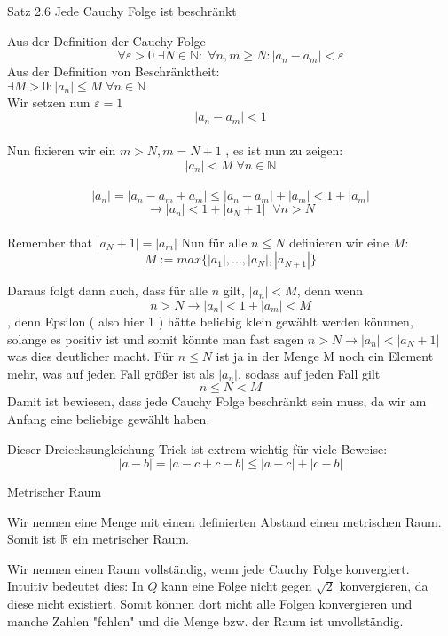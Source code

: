 \documentclass[headsepline,12pt,a4paper]{scrartcl}
\begin{document}
\newpage
\begin{center}
\item[Satz 2.6 Jede Cauchy Folge ist beschränkt]
\end{center}
\item Aus der Definition der Cauchy Folge 
$$ \forall \varepsilon > 0 \; \exists N \in \mathbb{N} : \; \forall n,m \geq N : |a_n-a_m| < \varepsilon $$
Aus der Definition von Beschränktheit: \\
$\exists M >0 : |a_n |\leq M \; \forall n \in \mathbb{N} $\\
Wir setzen nun $\varepsilon=1$ \\
$$ |a_n-a_m| < 1 $$ \\
Nun fixieren wir ein $m>N, m = N+1 $ , es ist nun zu zeigen:$$ |a_n | < M \; \forall n \in \mathbb{N} $$ \\

$$ |a_n | = |a_n-a_m+a_m| \leq |a_n -a_m| + |a_m | < 1 + |a_m | $$
$$ \rightarrow |a_n| < 1 +  |a_N+1 | \; \; \forall n > N $$ \\

Remember that $|a_N+1| = |a_m|$
Nun für alle $n \leq N $ definieren wir eine $M$: 
$$ M:= max\{|a_1|,...,|a_N|,|a_{N+1}| \} $$

\newpage


Daraus folgt dann auch, dass für alle $n$ gilt, $|a_n | < M $, denn wenn $$n>N \rightarrow |a_n| < 1 +  |a_m | < M $$, denn Epsilon ( also hier 1 ) hätte beliebig klein gewählt werden könnnen, solange es positiv ist und somit könnte man fast sagen $ n>N \rightarrow |a_n| <   |a_N+1| $ was dies deutlicher macht. Für $n \leq N $ ist ja in der Menge M noch ein Element mehr, was auf jeden Fall größer ist als $|a_n|$, sodass auf jeden Fall gilt \\
$$n \leq N < M $$
Damit ist bewiesen, dass jede Cauchy Folge beschränkt sein muss, da wir am Anfang eine beliebige gewählt haben. \\

\item Dieser Dreiecksungleichung Trick ist extrem wichtig für viele Beweise:
$$ |a-b| = |a-c+c-b| \leq |a-c| + |c-b| $$

\begin{center}
\item[Metrischer Raum]
\end{center}
\item Wir nennen eine Menge mit einem definierten Abstand einen metrischen Raum. Somit ist $\mathbb{R}$ ein metrischer Raum. 
\item Wir nennen einen Raum vollständig, wenn jede Cauchy Folge konvergiert. Intuitiv bedeutet dies: In $Q$ kann eine Folge nicht gegen $\sqrt{2}$ konvergieren, da diese nicht existiert. Somit können dort nicht alle Folgen konvergieren und manche Zahlen "fehlen" und die Menge bzw. der Raum ist unvollständig. \\
\end{document}

